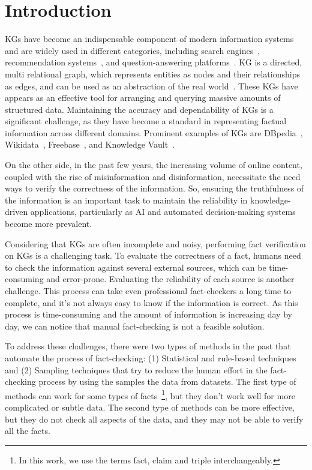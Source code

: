 \chapter{Introduction}\label{ch:intro}
\acp{KG} have become an indispensable component of modern information systems and are widely used in different categories, including search engines~\cite{google_knowledge_graph}, recommendation systems~\cite{guo2020surveyknowledgegraphbasedrecommender}, and question-answering platforms~\cite{omar2023universalquestionansweringplatformknowledge}.
\ac{KG} is a directed, multi relational graph, which represents entities as nodes and their relationships as edges, and can be used as an abstraction of the real world~\cite{ali2020keenuniverseecosystemknowledge}.
These \acp{KG} have appears as an effective tool for arranging and querying massive amounts of structured data.
Maintaining the accuracy and dependability of \acp{KG} is a significant challenge, as they have become a standard in representing factual information across diﬀerent domains.
Prominent examples of KGs are DBpedia~\cite{lehmann2015dbpedia}, Wikidata~\cite{10.1145/2629489}, Freebase~\cite{10.1145/1376616.1376746}, and Knowledge Vault~\cite{10.1145/2623330.2623623}.

On the other side, in the past few years, the increasing volume of online content, coupled with the rise of misinformation and disinformation, necessitate the need ways to verify the correctness of the information.
So, ensuring the truthfulness of the information is an important task to maintain the reliability in knowledge-driven applications, particularly as \ac{AI} and automated decision-making systems become more prevalent.

Considering that KGs are often incomplete and noisy, performing fact verification on \acp{KG} is a challenging task.
To evaluate the correctness of a fact, humans need to check the information against several external sources, which can be time-consuming and error-prone.
Evaluating the reliability of each source is another challenge.
This process can take even professional fact-checkers a long time to complete, and it's not always easy to know if the information is correct.
As this process is time-consuming and the amount of information is increasing day by day, we can notice that manual fact-checking is not a feasible solution.

To address these challenges, there were two types of methods in the past that automate the process of fact-checking:
(1) Statistical and rule-based techniques and (2) Sampling techniques that try to reduce the human effort in the fact-checking process by using the samples the data from datasets.
The first type of methods can work for some types of facts~\footnote{In this work, we use the terms fact, claim and triple interchangeably.}, but they don't work well for more complicated or subtle data.
The second type of methods can be more effective, but they do not check all aspects of the data, and they may not be able to verify all the facts.

